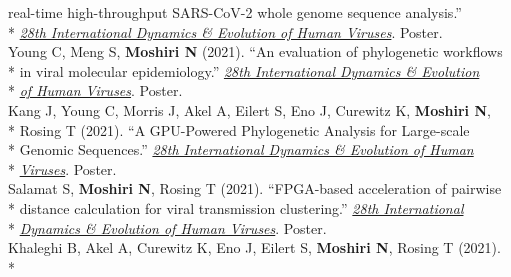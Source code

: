 \documentclass[margin,line]{res}
\begin{document}
\begin{resume}
\hspace*{9.5mm} real-time high-throughput SARS-CoV-2 whole genome sequence analysis.''\\*\vspace{2mm}
\hspace*{8mm} \href{https://cpd.ucsd.edu/hivdynamics/}{\textit{28th International Dynamics \& Evolution of Human Viruses}}. Poster.\\
\hspace*{4mm} Young C, Meng S, \textbf{Moshiri N} (2021). ``An evaluation of phylogenetic workflows\\*
\hspace*{9.5mm} in viral molecular epidemiology.'' \href{https://cpd.ucsd.edu/hivdynamics/}{\textit{28th International Dynamics \& Evolution}}\\*\vspace{2mm}
\hspace*{8mm} \href{https://cpd.ucsd.edu/hivdynamics/}{\textit{of Human Viruses}}. Poster.\\
\hspace*{4mm} Kang J, Young C, Morris J, Akel A, Eilert S, Eno J, Curewitz K, \textbf{Moshiri N},\\*
\hspace*{9.5mm}  Rosing T (2021). ``A GPU-Powered Phylogenetic Analysis for Large-scale\\*
\hspace*{9.5mm} Genomic Sequences.'' \href{https://cpd.ucsd.edu/hivdynamics/}{\textit{28th International Dynamics \& Evolution of Human}}\\*\vspace{2mm}
\hspace*{7.5mm} \href{https://cpd.ucsd.edu/hivdynamics/}{\textit{Viruses}}. Poster.\\
\hspace*{4mm} Salamat S, \textbf{Moshiri N}, Rosing T (2021). ``FPGA-based acceleration of pairwise\\*
\hspace*{9.5mm} distance calculation for viral transmission clustering.'' \href{https://cpd.ucsd.edu/hivdynamics/}{\textit{28th International}}\\*\vspace{2mm}
\hspace*{8mm} \href{https://cpd.ucsd.edu/hivdynamics/}{\textit{Dynamics \& Evolution of Human Viruses}}. Poster.\\
\hspace*{4mm} Khaleghi B, Akel A, Curewitz K, Eno J, Eilert S, \textbf{Moshiri N}, Rosing T (2021).\\*

\end{resume}
\end{document}
